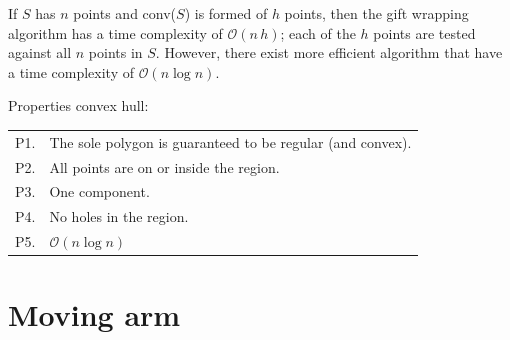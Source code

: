If $S$ has $n$ points and conv($S$) is formed of $h$ points, then the gift wrapping algorithm has a time complexity of $\mathcal{O}(n \, h)$; each of the $h$ points are tested against all $n$ points in $S$.
However, there exist more efficient algorithm that have a time complexity of $\mathcal{O}(n \log n)$.

%
Properties convex hull:
\\
\begin{tabular}{@{}ll@{}}
\toprule
  P1. & The sole polygon is guaranteed to be regular (and convex).  \\  
  P2. & All points are on or inside the region. \\ 
  P3. & One component.  \\ 
  P4. & No holes in the region.  \\  
  P5. & $\mathcal{O}(n \log n)$  \\  
\bottomrule
\end{tabular}



%
\section{Moving arm}


